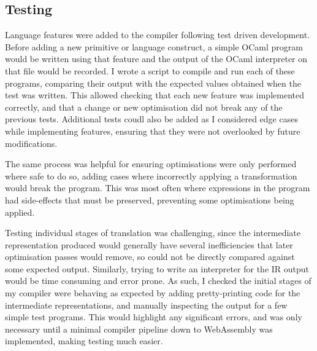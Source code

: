 
\subsection{Testing}
Language features were added to the compiler following test driven development. Before adding a new primitive or language construct, a simple OCaml program would be written using that feature and the output of the OCaml interpreter on that file would be recorded. 
I wrote a script to compile and run each of these programs, comparing their output with the expected values obtained when the test was written. This allowed checking that each new feature was implemented correctly, and that a change or new optimisation did not break any of the previous tests. Additional tests coudl also be added as I considered edge cases while implementing features, ensuring that they were not overlooked by future modifications.

 The same process was helpful for ensuring optimisations were only performed where safe to do so, adding cases where incorrectly applying a transformation would break the program. This was most often where expressions in the program had side-effects that must be preserved, preventing some optimisations being applied.



Testing individual stages of translation was challenging, since the intermediate representation produced would generally have several inefficiencies that later optimisation passes would remove, so could not be directly compared against some expected output. Similarly, trying to write an interpreter for the IR output would be time consuming and error prone. As such, I checked the initial stages of my compiler were behaving as expected by adding pretty-printing code for the intermediate representations, and manually inspecting the output for a few simple test programs. This would highlight any significant errors, and was only necessary until a minimal compiler pipeline down to WebAssembly was implemented, making testing much easier.

